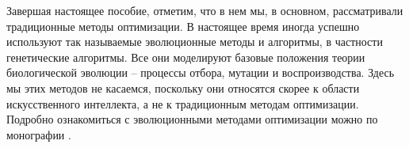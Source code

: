 Завершая настоящее пособие, отметим, что в нем мы, в основном, рассматривали традиционные методы оптимизации. В настоящее время иногда успешно используют так называемые эволюционные методы и алгоритмы, в частности генетические алгоритмы. Все они моделируют базовые положения теории биологической эволюции – процессы отбора, мутации и воспроизводства. Здесь мы этих методов не касаемся, поскольку они относятся скорее к области искусственного интеллекта, а не к традиционным методам оптимизации. Подробно ознакомиться с эволюционными методами оптимизации можно по монографии \cite{literature_gladkov}.
